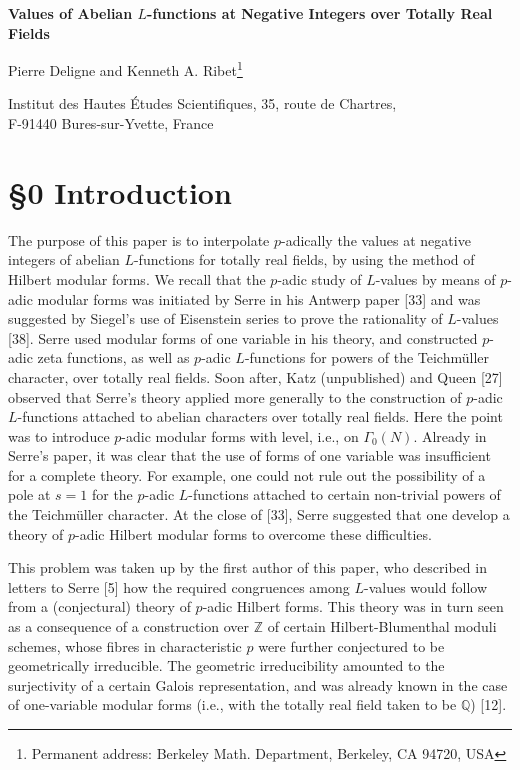 \documentclass[12pt,a4paper]{article}
\theoremstyle{plain}
\theoremstyle{definition}
\newcommand{\Z}{\mathbb{Z}}
\newcommand{\Q}{\mathbb{Q}}
\begin{document}
\thispagestyle{empty}

\begin{center}
{\Large\textbf{Values of Abelian $L$-functions at Negative Integers over Totally Real Fields}}
\end{center}

\begin{center}
Pierre Deligne and Kenneth A. Ribet\footnote{Permanent address: Berkeley Math. Department, Berkeley, CA 94720, USA}
\end{center}

\begin{center}\small
Institut des Hautes \'Etudes Scientifiques, 35, route de Chartres,\\
F-91440 Bures-sur-Yvette, France
\end{center}

\section*{\S0 Introduction}

The purpose of this paper is to interpolate $p$-adically the values at negative integers of abelian $L$-functions for totally real fields, by using the method of Hilbert modular forms. We recall that the $p$-adic study of $L$-values by means of $p$-adic modular forms was initiated by Serre in his Antwerp paper [33] and was suggested by Siegel's use of Eisenstein series to prove the rationality of $L$-values [38]. Serre used modular forms of one variable in his theory, and constructed $p$-adic zeta functions, as well as $p$-adic $L$-functions for powers of the Teichm\"uller character, over totally real fields. Soon after, Katz (unpublished) and Queen [27] observed that Serre's theory applied more generally to the construction of $p$-adic $L$-functions attached to abelian characters over totally real fields. Here the point was to introduce $p$-adic modular forms with level, i.e., on $\Gamma_0(N)$. Already in Serre's paper, it was clear that the use of forms of one variable was insufficient for a complete theory. For example, one could not rule out the possibility of a pole at $s=1$ for the $p$-adic $L$-functions attached to certain non-trivial powers of the Teichm\"uller character. At the close of [33], Serre suggested that one develop a theory of $p$-adic Hilbert modular forms to overcome these difficulties.

This problem was taken up by the first author of this paper, who described in letters to Serre [5] how the required congruences among $L$-values would follow from a (conjectural) theory of $p$-adic Hilbert forms. This theory was in turn seen as a consequence of a construction over $\Z$ of certain Hilbert-Blumenthal moduli schemes, whose fibres in characteristic $p$ were further conjectured to be geometrically irreducible. The geometric irreducibility amounted to the surjectivity of a certain Galois representation, and was already known in the case of one-variable modular forms (i.e., with the totally real field taken to be $\Q$) [12].
\end{document}
